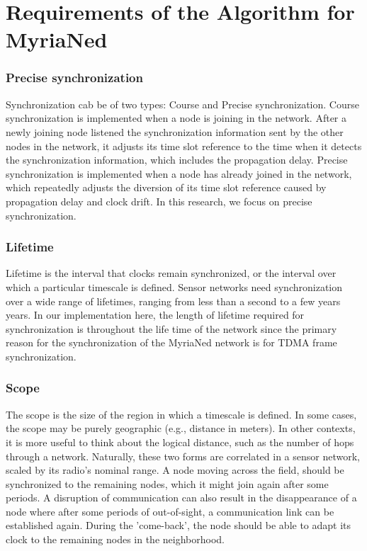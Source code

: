\documentclass[a4paper,10pt]{report}
\begin{document}
\section{\textbf{Requirements of the Algorithm for MyriaNed}}
\subsubsection{\textbf{Precise synchronization}}
Synchronization cab be of two types: Course and Precise synchronization. Course synchronization is implemented when a node is joining in the network. After a newly joining node listened the synchronization information sent by the other nodes in the network, it adjusts its time slot reference to the time when it detects the synchronization information, which includes the propagation delay. Precise synchronization is implemented when a node has already joined in the network, which repeatedly adjusts the diversion of its time slot reference caused by propagation delay and clock drift. In this research, we focus on precise synchronization.
\subsubsection{\textbf{Lifetime}} Lifetime is the interval that clocks remain synchronized, or the interval over which a particular
timescale is defined. Sensor networks need synchronization over a wide range of lifetimes, ranging from less than a second to a few years
years. In our implementation here, the length of lifetime required for synchronization is throughout the life time of the network since
the primary reason for the synchronization of the MyriaNed network is for TDMA frame synchronization.
\subsubsection{\textbf{Scope}} The scope is the size of the region in which a timescale is defined. In some cases, the scope may be purely
geographic (e.g., distance in meters). In other contexts, it is more useful to think about the logical distance, such as the number of
hops through a network. Naturally, these two forms are correlated in a sensor network, scaled by its radio's nominal range. A node moving across the field, should be synchronized to the remaining nodes, which it might join again after some periods. A disruption of communication can also result in the disappearance of a node where after some periods of out-of-sight, a communication link can be established again. During the 'come-back', the node should be able to adapt its clock to the remaining nodes in the neighborhood.
\end{document}
